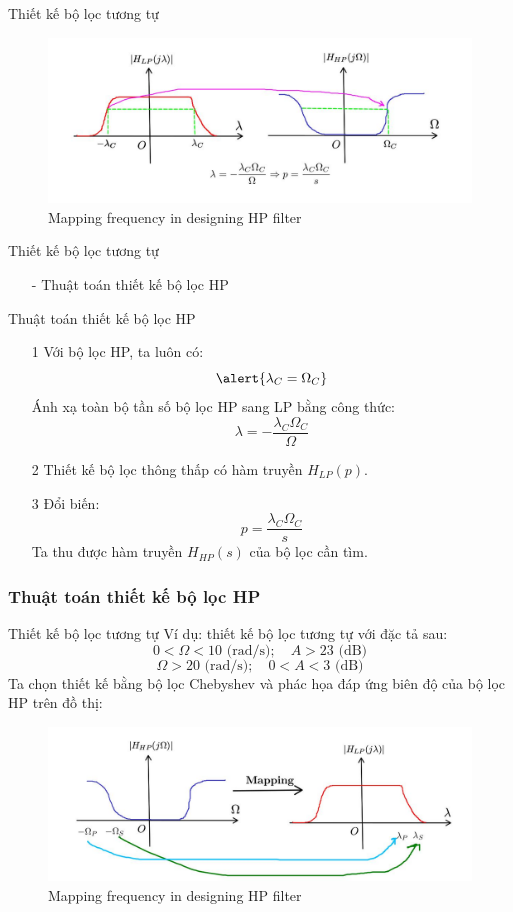 \documentclass[8pt]{beamer}
\begin{document}
\begin{frame}{Thiết kế bộ lọc tương tự}
\begin{figure}[h]
	\includegraphics[width=1\textwidth]{24.jpg}
	\caption{Mapping frequency in designing HP filter}			\label{fig:re2}
		\end{figure}


\end{frame}
\begin{frame}{Thiết kế bộ lọc tương tự}
	\begin{itemize}
		\item[-] Thuật toán thiết kế bộ lọc HP
	\end{itemize}
\begin{block}{Thuật toán thiết kế bộ lọc HP}
	\begin{enumerate}
		\item[1] Với bộ lọc HP, ta luôn có: $$\alert{\lambda_{C}=\Omega_{C}}$$ Ánh xạ toàn bộ tần số bộ lọc HP sang LP bằng công thức:
			$$\lambda=-\frac{\lambda_{C}\Omega_{C}}{\Omega}$$
		\item[2] Thiết kế bộ lọc thông thấp có hàm truyền $H_{LP}(p)$. 
		\item[3] Đổi biến: $$p=\frac{\lambda_{C}\Omega_{C}}{s}$$ Ta thu được hàm truyền $H_{HP}(s)$ của bộ lọc cần tìm.
	\end{enumerate}
\end{block}
\subsubsection{Thuật toán thiết kế bộ lọc HP}
\end{frame}
\begin{frame}{Thiết kế bộ lọc tương tự}
Ví dụ: thiết kế bộ lọc tương tự với đặc tả sau:
	$$0<\Omega<10\text{ (rad/s)}; \quad A>23\text{ (dB)}$$
	$$\Omega>20\text{ (rad/s)}; \quad 0<A<3\text{ (dB)}$$
Ta chọn thiết kế bằng bộ lọc Chebyshev và phác họa đáp ứng biên độ của bộ lọc HP trên đồ thị:
\begin{figure}[h]
	\includegraphics[width=1\textwidth]{25.jpg}
	\caption{Mapping frequency in designing HP filter}			\label{fig:re2}
		\end{figure}

\end{frame}
\end{document}
